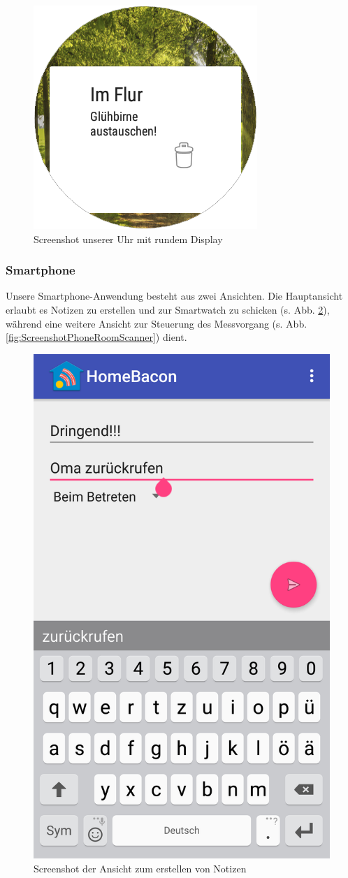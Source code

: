 \begin{figure}[H]
\centering
\includegraphics[width=0.3\linewidth]{../Bilder/ScreenshotWatchRund}
\caption{Screenshot unserer Uhr mit rundem Display}
\label{fig:ScreenshotWatchRund}
\end{figure}

\subsubsection{Smartphone}
Unsere Smartphone-Anwendung besteht aus zwei Ansichten. Die Hauptansicht erlaubt es Notizen zu erstellen und zur Smartwatch zu schicken (s. Abb. \ref{fig:ScreenshotPhoneMainActivity}), während eine weitere Ansicht zur Steuerung des Messvorgang (s. Abb. \ref{fig:ScreenshotPhoneRoomScanner}) dient.
 
\begin{figure}[H]
\centering
\includegraphics[width=0.4\linewidth]{../Bilder/ScreenshotPhoneMainActivity}
\caption{Screenshot der Ansicht zum erstellen von Notizen}
\label{fig:ScreenshotPhoneMainActivity}
\end{figure}

